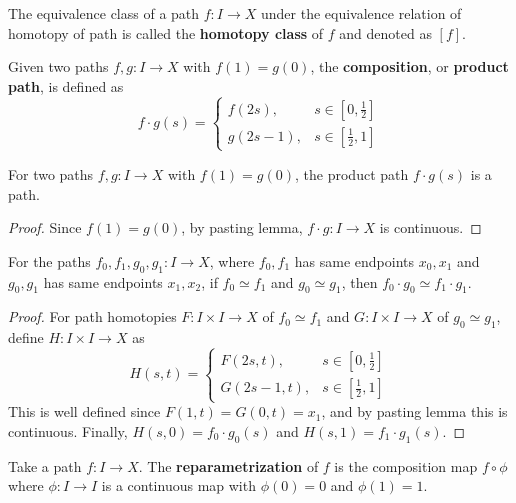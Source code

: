 \begin{defn} The equivalence class of a path $f:I\rightarrow X$ under the equivalence relation of homotopy of path is called the \textbf{homotopy class} of $f$ and denoted as $[f]$.
\end{defn}

\begin{defn} Given two paths $f,g:I\rightarrow X$ with $f(1)=g(0)$, the \textbf{composition}, or \textbf{product path}, is defined as
\begin{equation}
f\cdot g(s)=\begin{cases}
f(2s),&s\in[0,\frac{1}{2}]\\
g(2s-1),&s\in[\frac{1}{2},1]
\end{cases}
\end{equation}
\end{defn}
\begin{prop} For two paths $f,g:I\rightarrow X$ with $f(1)=g(0)$, the product path $f\cdot g(s)$ is a path.
\end{prop}
\begin{proof} Since $f(1)=g(0)$, by pasting lemma, $f\cdot g:I\rightarrow X$ is continuous.
\end{proof}

\begin{lemma} For the paths $f_0,f_1,g_0,g_1:I\rightarrow X$, where $f_0,f_1$ has same endpoints $x_0,x_1$ and $g_0,g_1$ has same endpoints $x_1,x_2$, if $f_0\simeq f_1$ and $g_0\simeq g_1$, then $f_0\cdot g_0\simeq f_1\cdot g_1$.
\end{lemma}
\begin{proof} For path homotopies $F:I\times I\rightarrow X$ of $f_0\simeq f_1$ and $G:I\times I\rightarrow X$ of $g_0\simeq g_1$, define $H:I\times I\rightarrow X$ as
\begin{equation}
H(s,t)=\begin{cases} F(2s,t),&s\in [0,\frac{1}{2}]\\
G(2s-1,t),&s\in [\frac{1}{2},1]
\end{cases}
\end{equation}
This is well defined since $F(1,t)=G(0,t)=x_1$, and by pasting lemma this is continuous. Finally, $H(s,0)=f_0\cdot g_0(s)$ and $H(s,1)=f_1\cdot g_1(s)$.
\end{proof}

\begin{defn} Take a path $f:I\rightarrow X$. The \textbf{reparametrization} of $f$ is the composition map $f\circ \phi$ where $\phi:I\rightarrow I$ is a continuous map with $\phi(0)=0$ and $\phi(1)=1$.
\end{defn}

